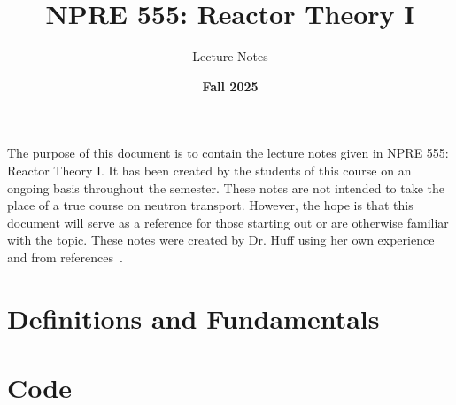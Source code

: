 \documentclass{lecture_notes}
\title{NPRE 555: Reactor Theory I}
\subtitle{Lecture Notes}
\date{\textbf{Fall 2025}}
\theoremstyle{definition}
\begin{document}
\frontmatter

\begin{foreword}
  The purpose of this document is to contain the lecture notes given in NPRE 555: Reactor Theory I.
  It has been created by the students of this course on an ongoing basis throughout the semester.
  These notes are not intended to take the place of a true course on neutron transport.
  However, the hope is that this document will serve as a reference for those starting out or are otherwise familiar with the topic.
  These notes were created by Dr. Huff using her own experience and from references~\cite{bellNuclear_reactor_theory_bell_glasstone1970,duderstadtTransportTheory1979,lewisComputationalMethodsNeutron1993,staceyNuclearReactorPhysics2007}.
\end{foreword}

\tableofcontents
\clearpage

\pagestyle{fancy} %
\fancyhf{}
\fancyfoot[C]{\thepage} %
\setcounter{page}{1}

\section{Definitions and Fundamentals}

\appendix
\section{Code}



\end{document}
